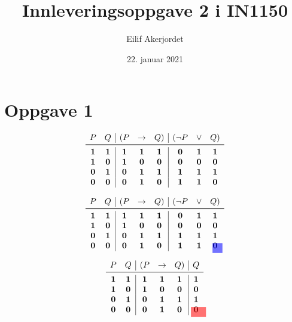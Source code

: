 \documentclass{in1150-innlevering}
\title{Innleveringsoppgave 2 i IN1150}
\author{Eilif Akerjordet}
\date{22. januar 2021}
\begin{document}
\maketitle

\section*{Oppgave 1}
\begin{deloppgaver}
    \item
      \[
        \begin{array}{cc|ccc|ccc}
          P&Q&(P&\imp& Q)&(\neg P&\lor& Q)\\\midrule
          \T&\T&\T&\T&\T&\F&\T&\T\\
          \T&\F&\T&\F&\F&\F&\F&\F\\
          \F&\T&\F&\T&\T&\T&\T&\T\\
          \F&\F&\F&\T&\F&\T&\T&\F
        \end{array}
      \]
    \item
      \[
        \begin{array}{cc|ccc|ccc}
          P&Q&(P&\imp& Q)&(\neg P&\lor& Q)\\\midrule
          \T&\T&\T&\rem{a}{\T}&\T&\F&\rem{c}{\T}&\T\\
          \T&\F&\T&\F&\F&\F&\F&\F\\
          \F&\T&\F&\T&\T&\T&\T&\T\\
          \F&\F&\F&\rem{b}{\T}&\F&\T&\rem{d}{\T}&\F
          \tikz[blue,remember picture,overlay,line width=2.75ex,opacity=0.33,line cap=rect]\draw (a.center) -- (b.center);
          \tikz[blue,remember picture,overlay,line width=2.75ex,opacity=0.33,line cap=rect]\draw (c.center) -- (d.center);
        \end{array}
      \]
    \item
      \[
        \begin{array}{cc|ccc|c}
          P&Q&(P&\imp& Q)&Q\\\midrule
          \T&\T&\T&\T&\T&\T\\
          \T&\F&\T&\F&\F&\F\\
          \F&\T&\F&\T&\T&\T\\
          \F&\F&\F&\rem{a}{\T}&\F&\rem{b}{\F}
          \tikz[red,remember picture,overlay,line width=2.75ex,opacity=0.33,line cap=rect]\draw (a.west) -- (a.east);
          \tikz[red,remember picture,overlay,line width=2.75ex,opacity=0.33,line cap=rect]\draw (b.west) -- (b.east);
        \end{array}
      \]
\end{deloppgaver}
\end{document}
